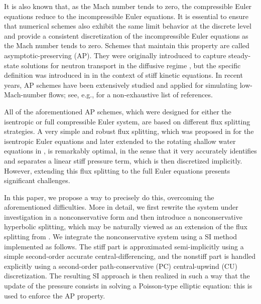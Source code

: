 \documentclass[A4paper,12pt,twoside]{article}
\numberwithin{equation}{section}
\numberwithin{figure}{section}
\numberwithin{table}{section}
\newcommand{\lore}[1]{{\leavevmode\color{red} #1}}
\begin{document}
It is also known that, as the Mach number tends to zero, the compressible Euler equations reduce to the incompressible Euler equations. It is
essential to ensure \lore{that} %
numerical schemes also exhibit the same \lore{limit} %
behavior at the discrete level and provide a
consistent discretization of the incompressible Euler equations as the Mach number tends to zero. Schemes that maintain this property are
called asymptotic-preserving (AP). They \lore{were originally introduced to capture} %
steady-state solutions for neutron transport in the diffusive regime
\cite{LMM,LarMor}, but the \lore{specific definition was introduced} %
in \cite{GJL,jin1999efficient,Kla99} in the context of stiff kinetic equations.
In recent years, AP schemes have been extensively studied and applied for simulating low-Mach-number flows; see, e.g.,
\cite{AllVig,boscarino2019high,boscarino2018all,BDLTV,CGK,cordier2012asymptotic,DJL,degond2011all,DLMV,dimarco2017study,haack2012all,Kle95,arun2014asymptotic,Tang12,TorVaz,zeifang2020novel}
for a non-exhaustive list of references.

All of the aforementioned AP schemes, which were designed for either the isentropic or full compressible Euler system, are based on 
different flux splitting strategies. 
A very simple and robust flux splitting, which was proposed in \cite{haack2012all} for the isentropic 
Euler equations and later extended to the rotating shallow water equations in \cite{LCK}, is \lore{remarkably optimal, in the sense that}
\lore{it very accurately identifies and separates} a linear stiff pressure term, which is then discretized implicitly. However, extending this 
flux splitting to the full Euler equations presents significant challenges. 

In this paper, we propose \lore{a way to precisely do this, overcoming the aforementioned difficulties}. %
\lore{More in detail,} we first
rewrite the %
system \lore{under investigation}
in a nonconservative form and then introduce a nonconservative hyperbolic splitting, which may be naturally
viewed as an extension of the flux splitting from \cite{haack2012all}. We integrate the nonconservative system using a SI method implemented
as follows. The stiff part is approximated semi-implicitly using a simple second-order accurate central-differencing, and the nonstiff part 
is \lore{handled explicitly} %
using a %
second-order path-conservative (PC) central-upwind (CU) \lore{discretization}. %
The resulting SI \lore{approach} %
is then
realized in such a way that the \lore{update of the} pressure %
\lore{consists in} solving a Poisson-type elliptic equation: this \lore{is used}
to enforce the AP property.
\end{document}
